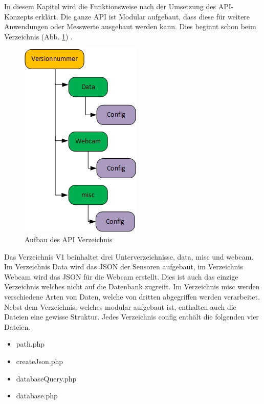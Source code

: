 In diesem Kapitel wird die Funktionsweise nach der Umsetzung des API-Konzepts erklärt. Die ganze API ist Modular aufgebaut, dass diese für weitere Anwendungen oder Messwerte ausgebaut werden kann. Dies beginnt schon beim Verzeichnis (Abb. \ref{img:APIVerzeichnis}) .


\begin{figure}[h!]
	\centering
	\includegraphics[width=0.3\linewidth]{img/APIVerzeichnis.jpg}
	\caption{Aufbau des API Verzeichnis}
	\label{img:APIVerzeichnis}
\end{figure}

Das Verzeichnis V1 beinhaltet drei Unterverzeichnisse, data, misc und webcam. Im Verzeichnis Data wird das JSON der Sensoren aufgebaut, im Verzeichnis Webcam wird das JSON für die Webcam erstellt. Dies ist auch das einzige Verzeichnis welches nicht auf die Datenbank zugreift. Im Verzeichnis misc werden verschiedene Arten von Daten, welche von dritten abgegriffen werden verarbeitet. Nebst dem Verzeichnis, welches modular aufgebaut ist, enthalten auch die Dateien eine gewisse Struktur. Jedes Verzeichnis config enthält die folgenden vier Dateien. 
\begin{itemize}
\item path.php
\item createJson.php
\item databaseQuery.php
\item database.php
\end{itemize}

